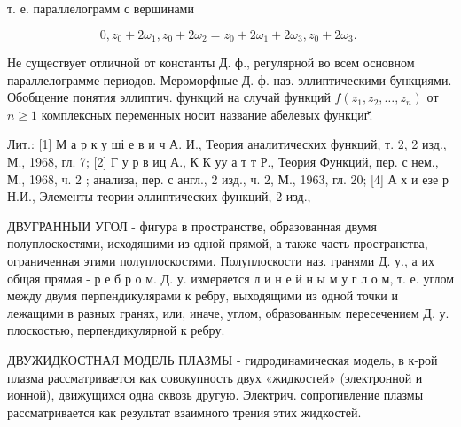 \documentclass[10pt]{article}
\begin{document}
т. е. параллелограмм с вершинами



\[

0, z_{0}+2 \omega_{1}, z_{0}+2 \omega_{2}=z_{0}+2 \omega_{1}+2 \omega_{3}, z_{0}+2 \omega_{3} \text {. }

\]



Не существует отличной от константы Д. ф., регулярной во всем основном параллелограмме периодов. Мероморфные Д. ф. наз. эллиптическими бункциями. Обобщение понятия эллиптич. функций на случай функций $f\left(z_{1}, z_{2}, \ldots, z_{n}\right)$ от $n \geqslant 1$ комплексных переменных носит название абелевых функциг̆.



Лит.: [1] М а р к у ші е в и ч А. И., Теория аналитических функций, т. 2, 2 изд., М., 1968, гл. 7; [2] Г у р в иц А., К К уу а т т Р., Теория Функций, пер. с нем., М., 1968, ч. 2 ; анализа, пер. с англ., 2 изд., ч. 2, М., 1963, гл. 20; [4] А х и езе р Н.И., Элементы теории әллиптических функций, 2 изд.,



ДВУГРАННЫИ УГОЛ - фигура в пространстве, образованная двумя полуплоскостями, исходящими из одной прямой, а также часть пространства, ограниченная этими полуплоскостями. Полуплоскости наз. гранями Д. у., а их общая прямая - р е б р о м. Д. у. измеряется л и н е й н ы м у г л о м, т. е. углом между двумя перпендикулярами к ребру, выходящими из одной точки и лежащими в разных гранях, или, иначе, углом, образованным пересечением Д. у. плоскостью, перпендикулярной к ребру.



ДВУЖИДКОСТНАЯ МОДЕЛЬ ПЛАЗМЫ - гидродинамическая модель, в к-рой плазма рассматривается как совокупность двух «жидкостей» (электронной и ионной), движущихся одна сквозь другую. Электрич. сопротивление плазмы рассматривается как результат взаимного трения этих жидкостей.
\end{document}
